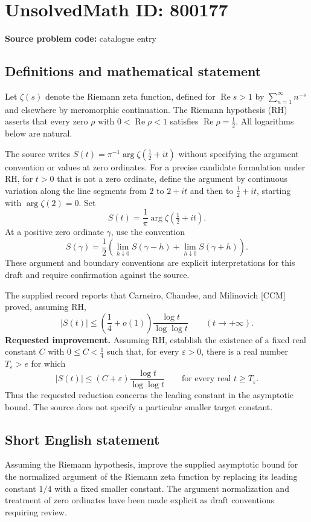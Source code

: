 \documentclass[11pt]{article}
\begin{document}
\section*{UnsolvedMath ID: 800177}
\textbf{Source problem code:} catalogue entry
\subsection{Definitions and mathematical statement}
Let \(\zeta(s)\) denote the Riemann zeta function, defined for \(\operatorname{Re}s>1\) by \(\sum_{n=1}^{\infty}n^{-s}\) and elsewhere by meromorphic continuation. The Riemann hypothesis (RH) asserts that every zero \(\rho\) with \(0<\operatorname{Re}\rho<1\) satisfies \(\operatorname{Re}\rho=\tfrac12\). All logarithms below are natural.

The source writes \(S(t)=\pi^{-1}\arg\zeta(\tfrac12+it)\) without specifying the argument convention or values at zero ordinates. For a precise candidate formulation under RH, for \(t>0\) that is not a zero ordinate, define the argument by continuous variation along the line segments from \(2\) to \(2+it\) and then to \(\tfrac12+it\), starting with \(\arg\zeta(2)=0\). Set
\[
S(t)=\frac{1}{\pi}\arg\zeta\!\left(\tfrac12+it\right).
\]
At a positive zero ordinate \(\gamma\), use the convention
\[
S(\gamma)=\frac12\left(\lim_{h\downarrow0}S(\gamma-h)+\lim_{h\downarrow0}S(\gamma+h)\right).
\]
These argument and boundary conventions are explicit interpretations for this draft and require confirmation against the source.

The supplied record reports that Carneiro, Chandee, and Milinovich [CCM] proved, assuming RH,
\[
|S(t)|\leq\left(\frac14+o(1)\right)\frac{\log t}{\log\log t}
\qquad(t\to+\infty).
\]
\textbf{Requested improvement.} Assuming RH, establish the existence of a fixed real constant \(C\) with \(0\leq C<\tfrac14\) such that, for every \(\varepsilon>0\), there is a real number \(T_{\varepsilon}>e\) for which
\[
|S(t)|\leq(C+\varepsilon)\frac{\log t}{\log\log t}
\qquad\text{for every real }t\geq T_{\varepsilon}.
\]
Thus the requested reduction concerns the leading constant in the asymptotic bound. The source does not specify a particular smaller target constant.
\subsection{Short English statement}
Assuming the Riemann hypothesis, improve the supplied asymptotic bound for the normalized argument of the Riemann zeta function by replacing its leading constant \(1/4\) with a fixed smaller constant. The argument normalization and treatment of zero ordinates have been made explicit as draft conventions requiring review.
\end{document}
